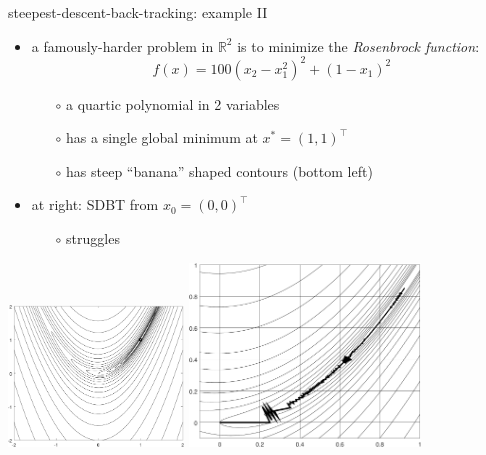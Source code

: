 \documentclass[10pt,hyperref]{beamer}
\newcommand{\RR}{\mathbb{R}}
\begin{document}
\begin{frame}{steepest-descent-back-tracking: example II}

\begin{itemize}
\item a famously-harder problem in $\RR^2$ is to minimize the \emph{Rosenbrock function}:
    $$f(x) = 100 (x_2 - x_1^2)^2 + (1 - x_1)^2$$
    \begin{itemize}
    \vspace{-4mm}
    \item[$\circ$] a quartic polynomial in 2 variables
    \item[$\circ$] has a single global minimum at $x^*=(1,1)^\top$
    \item[$\circ$] has steep ``banana'' shaped contours (bottom left)
    \end{itemize}

\smallskip
\item at right: SDBT from $x_0=(0,0)^\top$
    \begin{itemize}
    \item[$\circ$] struggles
    \end{itemize}
\end{itemize}

\vspace{-8mm}

\hspace{0.3in}
\includegraphics[width=0.35\textwidth,keepaspectratio=true]{rosencontour}
\hspace{0.3in}
\includegraphics[width=0.46\textwidth,keepaspectratio=true]{sdrosenslow}
\end{frame}
\end{document}
